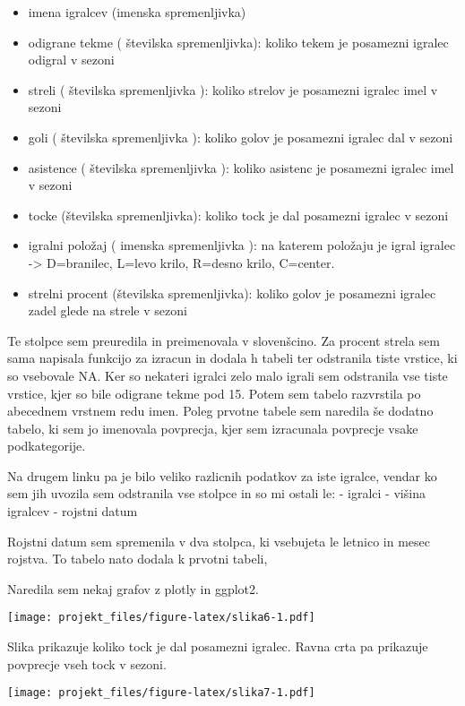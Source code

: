 \documentclass[]{article}
\begin{document}
\begin{itemize}
\itemsep1pt\parskip0pt
\item
  imena igralcev (imenska spremenljivka)
\item
  odigrane tekme ( številska spremenljivka): koliko tekem je posamezni
  igralec odigral v sezoni
\item
  streli ( številska spremenljivka ): koliko strelov je posamezni
  igralec imel v sezoni
\item
  goli ( številska spremenljivka ): koliko golov je posamezni igralec
  dal v sezoni
\item
  asistence ( številska spremenljivka ): koliko asistenc je posamezni
  igralec imel v sezoni
\item
  tocke (številska spremenljivka): koliko tock je dal posamezni igralec
  v sezoni
\item
  igralni položaj ( imenska spremenljivka ): na katerem položaju je
  igral igralec -\textgreater{} D=branilec, L=levo krilo, R=desno krilo,
  C=center.
\item
  strelni procent (številska spremenljivka): koliko golov je posamezni
  igralec zadel glede na strele v sezoni
\end{itemize}

Te stolpce sem preuredila in preimenovala v slovenšcino. Za procent
strela sem sama napisala funkcijo za izracun in dodala h tabeli ter
odstranila tiste vrstice, ki so vsebovale NA. Ker so nekateri igralci
zelo malo igrali sem odstranila vse tiste vrstice, kjer so bile odigrane
tekme pod 15. Potem sem tabelo razvrstila po abecednem vrstnem redu
imen. Poleg prvotne tabele sem naredila še dodatno tabelo, ki sem jo
imenovala povprecja, kjer sem izracunala povprecje vsake podkategorije.

Na drugem linku pa je bilo veliko razlicnih podatkov za iste igralce,
vendar ko sem jih uvozila sem odstranila vse stolpce in so mi ostali le:
- igralci - višina igralcev - rojstni datum

Rojstni datum sem spremenila v dva stolpca, ki vsebujeta le letnico in
mesec rojstva. To tabelo nato dodala k prvotni tabeli,

Naredila sem nekaj grafov z plotly in ggplot2.

\texttt{[image: projekt\_files/figure-latex/slika6-1.pdf]}

Slika prikazuje koliko tock je dal posamezni igralec. Ravna crta pa
prikazuje povprecje vseh tock v sezoni.

\texttt{[image: projekt\_files/figure-latex/slika7-1.pdf]}
\end{document}
